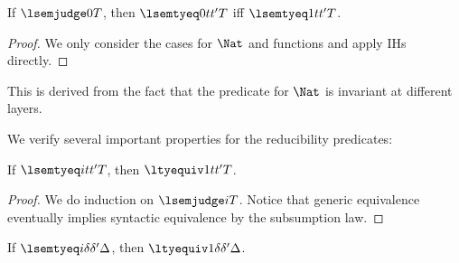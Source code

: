 \begin{lemma}
  If $\lsemjudge 0 T$, then $\lsemtyeq 0 {t}{t'} T$ iff $\lsemtyeq 1 {t}{t'} T$.
\end{lemma}
\begin{proof}
  We only consider the cases for $\Nat$ and functions and apply IHs directly. 
\end{proof}
This is derived from the fact that the predicate for $\Nat$ is invariant at
different layers. %

We verify several important properties for the reducibility predicates:
\begin{lemma}[Escape]
  If $\lsemtyeq i {t}{t'} T$, then $\ltyequiv 1 {t}{t'}T$.
\end{lemma}
\begin{proof}
  We do induction on $\lsemjudge i T$. %
  Notice that generic equivalence eventually implies syntactic equivalence by the
  subsumption law. 
\end{proof}
\begin{lemma}[Escape]
  If $\lsemtyeq i {\delta}{\delta'} \Delta$, then $\ltyequiv 1 {\delta}{\delta'}\Delta$.
\end{lemma}

